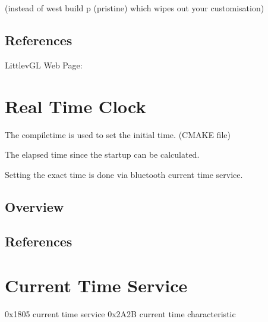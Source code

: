 \documentclass[letterpaper,10pt,english]{sphinxmanual}
\begin{document}
(instead of west build \sphinxhyphen{}p (pristine) which wipes out your customisation)


\section{References}
\label{\detokenize{lvgl:references}}

LittlevGL Web Page: 


\chapter{Real Time Clock}
\label{\detokenize{RTC:real-time-clock}}\label{\detokenize{RTC:rtc}}\label{\detokenize{RTC::doc}}
The compile\sphinxhyphen{}time is used to set the initial time. (CMAKE file)

The elapsed time since the startup can be calculated.

Setting the exact time is done via bluetooth current time service.


\section{Overview}
\label{\detokenize{RTC:overview}}

\section{References}
\label{\detokenize{RTC:references}}

\chapter{Current Time Service}
\label{\detokenize{current-time:current-time-service}}\label{\detokenize{current-time::doc}}
0x1805 current time service
0x2A2B current time characteristic
\end{document}
